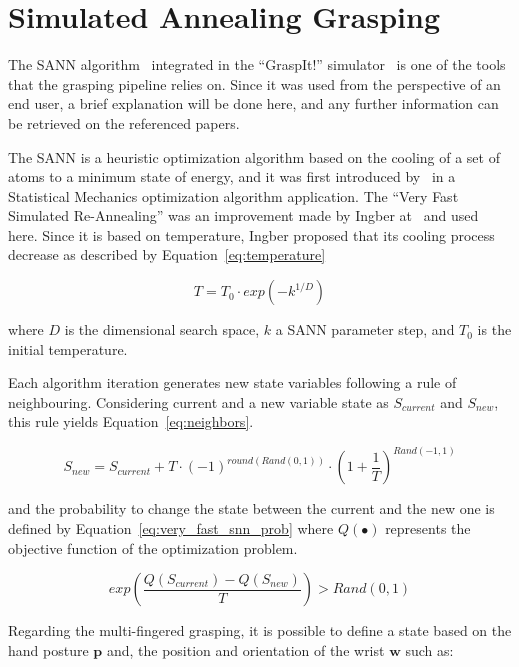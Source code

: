 \section{Simulated Annealing Grasping}
\label{sec:sim_ann}

The \ac{SANN} algorithm~\cite{Ciocarlie2009} integrated in the ``GraspIt!'' simulator~\cite{AndrewT2004} is one of the tools that the grasping pipeline relies on. Since it was used from the perspective of an end user, a brief explanation will be done here, and any further information can be retrieved on the referenced papers.

The \ac{SANN} is a heuristic optimization algorithm based on the cooling of a set of atoms to a minimum state of energy, and it was first introduced by~\cite{kirkpatrick1983} in a Statistical Mechanics optimization algorithm application. The ``Very Fast Simulated Re-Annealing'' was an improvement made by Ingber at~\cite{ingber1988} and used here. Since it is based on temperature, Ingber proposed that its cooling process decrease as described by Equation~\ref{eq:temperature}

\begin{equation}
T=T_{0} \cdot exp{(-k^{1/D})}
\label{eq:temperature}
\end{equation}

\noindent
where $D$ is the dimensional search space, $k$ a \ac{SANN} parameter step, and $T_0$ is the initial temperature.

Each algorithm iteration generates new state variables following a rule of neighbouring. Considering current and a new variable state as $S_{current}$ and $S_{new}$, this rule yields Equation~\ref{eq:neighbors}.

\begin{equation}
S_{new}=S_{current}+T \cdot(-1)^{round(Rand(0,1))} \cdot\left(1+\frac{1}{T}\right)^{Rand(-1,1)}
\label{eq:neighbors}
\end{equation}

\noindent
and the probability to change the state between the current and the new one is defined by Equation~\ref{eq:very_fast_snn_prob} where $Q(\bullet)$ represents the objective function of the optimization problem.

\begin{equation}
exp({\frac{Q(S_{current})-Q(S_{new})}{T}})>Rand(0,1)
\label{eq:very_fast_snn_prob}
\end{equation}

Regarding the multi-fingered grasping, it is possible to define a state based on the hand posture $\mathbf{p}$ and, the position and orientation of the wrist $\mathbf{w}$ such as: 

